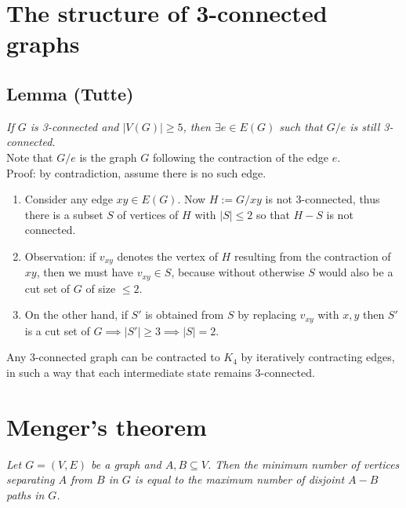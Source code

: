 		
	\section{The structure of 3-connected graphs}

		\subsection{Lemma (Tutte)}
		\textit{If $G$ is 3-connected and $|V(G)| \geq 5$, then $\exists e \in E (G)$ such that $G / e$ is still 3-connected.}\\
		
		Note that $G / e$ is the graph $G$ following the contraction of the edge $e$.\\
		
		Proof: by contradiction, assume there is no such edge.
		\begin{enumerate}
			\item Consider any edge $xy \in E(G)$. Now $H := G / xy$ is not 3-connected, thus there is a subset $S$ of vertices of $H$ with $|S| \leq 2$ so that $H - S$ is not connected. 
			\item Observation: if $v_{xy}$ denotes the vertex of $H$ resulting from the contraction of $xy$, then we must have $v_{xy} \in S$, because without otherwise $S$ would also be a cut set of $G$ of size $\leq 2$.
			\item On the  other hand, if $S'$ is obtained from $S$ by replacing $v_{xy}$ with $x,y$ then $S'$ is a cut set of $G \implies |S'| \geq 3 \implies |S| = 2$.
		\end{enumerate}
		
		Any 3-connected graph can be contracted to $K_4$ by iteratively contracting edges, in such a way that each intermediate state remains 3-connected.
		
		
	\section{Menger's theorem}
		\textit{Let $G = (V,E)$ be a graph and $A, B \subseteq V$. Then the minimum number of vertices separating $A$ from $B$ in $G$ is equal to the maximum number of disjoint $A-B$ paths in $G$.\\}

